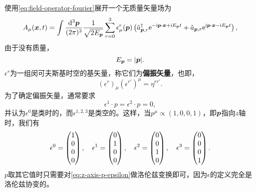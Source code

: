 \documentclass[hyperref, UTF8, a4paper]{ctexart}
\newcommand*{\ii}{\mathrm{i}}
\newcommand*{\ee}{\mathrm{e}}
\begin{document}
使用\eqref{eq:field-operator-fourier}展开一个无质量矢量场为
\begin{equation}
    A_\mu (\vb*{x}, t) = \int \frac{\dd[3]{\vb*{p}}}{(2\pi)^3} \frac{1}{\sqrt{2 E_{\vb*{p}}}} \sum_{r=0}^3 \epsilon_\mu^r(\vb*{p}) \left(\hat{a}_{\vb*{p}, r}^\dagger \ee^{ - \ii \vb*{p} \cdot \vb*{x} + \ii E_{\vb*{p}} t} + \hat{a}_{\vb*{p}, r} \ee^{ \ii \vb*{p} \cdot \vb*{x} - \ii E_{\vb*{p}} t} \right), 
    \label{eq:expanding-massless-vector-field}
\end{equation}
由于没有质量，
\begin{equation}
    E_{\vb*{p}} = \abs{\vb*{p}}.
\end{equation}
$\epsilon^r$为一组闵可夫斯基时空的基矢量，称它们为\textbf{偏振矢量}，也即，
\begin{equation}
    (\epsilon^r)_\mu (\epsilon^{r'})^\mu = \eta^{r r'}.
\end{equation}
为了确定偏振矢量，通常要求
\begin{equation}
    \epsilon^1 \cdot p = \epsilon^2 \cdot p = 0,
\end{equation}
并认为$\epsilon^0$是类时的，而$\epsilon^{1,2,3}$是类空的。这样，当$p^\mu \propto (1, 0, 0, 1)$，即$\vb*{p}$指向$z$轴时，我们有
\begin{equation}
    \epsilon^0 = \pmqty{1 \\ 0 \\ 0 \\ 0}, \quad \epsilon^1 = \pmqty{0 \\ 1 \\ 0 \\ 0}, \quad \epsilon^2 = \pmqty{0 \\ 0 \\ 1 \\ 0}, \quad \epsilon^3 = \pmqty{0 \\ 0 \\ 0 \\ 1}.
    \label{eq:z-axis-p-epsilon}
\end{equation}
$p$取其它值时只需要对\eqref{eq:z-axis-p-epsilon}做洛伦兹变换即可，因为$\epsilon$的定义完全是洛伦兹协变的。
\end{document}
